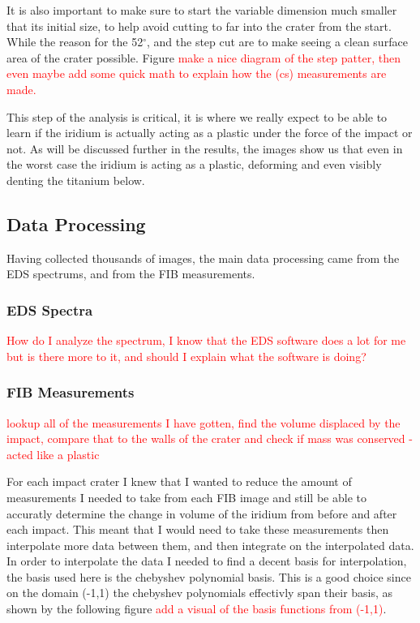 \documentclass[review]{elsarticle}
\begin{document}
			It is also important to make sure to start the variable dimension much smaller that its initial size, to help avoid cutting to far into the crater from the start. While the 
			reason for the 52$^\circ$, and the step cut are to make seeing a clean surface area of the crater possible. Figure \textcolor{red}{make a nice diagram of the step patter,
			then even maybe add some quick math to explain how the (cs) measurements are made.} 

			This step of the analysis is critical, it is where we really expect to be able to learn if the iridium is actually acting as a plastic under the force of the impact or not. 
			As will be discussed further in the results, the images show us that even in the worst case the iridium is acting as a plastic, deforming and even visibly denting the titanium 
			below. 


		\subsection{Data Processing}
		Having collected thousands of images, the main data processing came from the EDS spectrums, and from the FIB measurements. 

		\subsubsection{EDS Spectra}

		\textcolor{red}{How do I analyze the spectrum, I know that the EDS software does a lot for me but is there more to it, and should I explain what the software is doing?}

		\subsubsection{FIB Measurements}

		\textcolor{red}{lookup all of the measurements I have gotten, find the volume displaced by the impact, compare that to the walls of the crater and check if 
						mass was conserved - acted like a plastic}

		For each impact crater I knew that I wanted to reduce the amount of measurements I needed to take from each FIB image and still be able to accuratly determine the change in volume of the iridium from before
		and after each impact. This meant that I would need to take these measurements then interpolate more data between them, and then integrate on the interpolated data. In order to interpolate the data I needed 
		to find a decent basis for interpolation, the basis used here is the chebyshev polynomial basis. This is a good choice since on the domain (-1,1) the chebyshev polynomials effectivly span their basis, as shown
		by the following figure \textcolor{red}{add a visual of the basis functions from (-1,1)}. 
\end{document}

